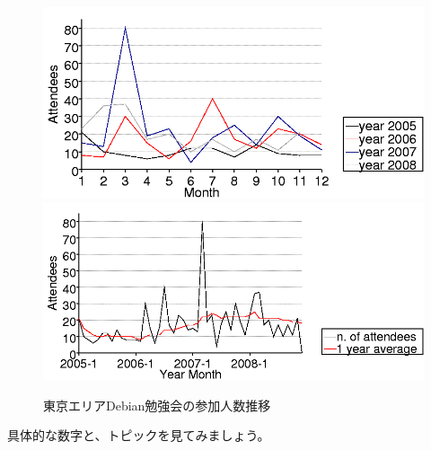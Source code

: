 \documentclass[mingoth,a4paper]{jsarticle}
\begin{document}
\begin{figure}[h]
 \begin{center}
  \includegraphics[width=1\hsize]{image200812/people-chart.png}
  \includegraphics[width=1\hsize]{image200812/serialized.png}
 \end{center}
\caption{東京エリアDebian勉強会の参加人数推移}
\label{fig:peoplechart}
\end{figure}


具体的な数字と、トピックを見てみましょう。
 
\end{document}
